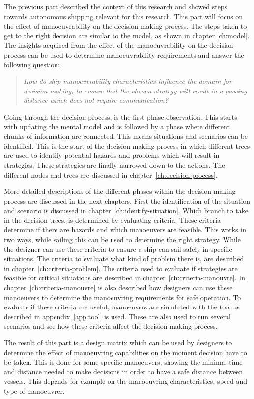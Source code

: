 The previous part described the context of this research and showed steps towards autonomous shipping relevant for this research. This part will focus on the effect of manoeuvrability on the decision making process. The steps taken to get to the right decision are similar to the model, as shown in chapter \ref{ch:model}. The insights acquired from the effect of the manoeuvrability on the decision process can be used to determine manoeuvrability requirements and answer the following question:

\begin{quotation}
	\emph{How do ship manoeuvrability characteristics influence the domain for decision making, to ensure that the chosen strategy will result in a passing distance which does not require communication?} 
\end{quotation}

Going through the decision process, is the first phase observation. This starts with updating the mental model and is followed by a phase where different chunks of information are connected. This means situations and scenarios can be identified. This is the start of the decision making process in which different trees are used to identify potential hazards and problems which will result in strategies. These strategies are finally narrowed down to the actions. The different nodes and trees are discussed in chapter~\ref{ch:decision-process}. 

More detailed descriptions of the different phases within the decision making process are discussed in the next chapters. First the identification of the situation and scenario is discussed in chapter~\ref{ch:identify-situation}.
Which branch to take in the decision trees, is determined by evaluating criteria. These criteria determine if there are hazards and which manoeuvers are feasible. This works in two ways, while sailing this can be used to determine the right strategy. While the designer can use these criteria to ensure a ship can sail safely in specific situations. The criteria to evaluate what kind of problem there is, are described in chapter~\ref{ch:criteria-problem}. The criteria used to evaluate if strategies are feasible for critical situations are described in chapter~\ref{ch:criteria-manouvre}. In chapter~\ref{ch:criteria-manouvre} is also described how designers can use these manoeuvers to determine the manoeuvring requirements for safe operation. To evaluate if these criteria are useful, manoeuvers are simulated with the tool as described in appendix~\ref{app:tool} is used. These are also used to run several scenarios and see how these criteria affect the decision making process.

The result of this part is a design matrix which can be used by designers to determine the effect of manoeuvring capabilities on the moment decision have to be taken. This is done for some specific manoeuvers, showing the minimal time and distance needed to make decisions in order to have a safe distance between vessels. This depends for example on the manoeuvring characteristics, speed and type of manoeuvrer.
